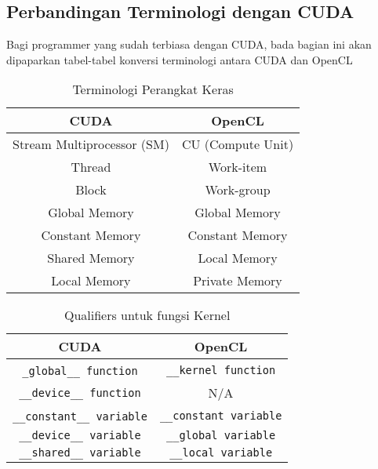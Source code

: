 \subsection{Perbandingan Terminologi dengan CUDA}

Bagi programmer yang sudah terbiasa dengan CUDA, bada bagian ini akan dipaparkan tabel-tabel konversi terminologi antara CUDA dan OpenCL

\begin{table}
	\centering
	\caption{Terminologi Perangkat Keras}
	\label{tab:terminologi_perangkat_keras}
	\begin{tabular}{|c|c|}
		\rowcolor[gray]{.9} \hline \rule[-2ex]{0pt}{5.5ex} CUDA & OpenCL \\ 
		\hline \rule[-2ex]{0pt}{5.5ex} Stream Multiprocessor (SM) & CU (Compute Unit) \\ 
		\hline \rule[-2ex]{0pt}{5.5ex} Thread & Work-item \\ 
		\hline \rule[-2ex]{0pt}{5.5ex} Block & Work-group \\ 
		\hline \rule[-2ex]{0pt}{5.5ex} Global Memory & Global Memory \\ 
		\hline \rule[-2ex]{0pt}{5.5ex} Constant Memory & Constant Memory \\ 
		\hline \rule[-2ex]{0pt}{5.5ex} Shared Memory & Local Memory \\ 
		\hline \rule[-2ex]{0pt}{5.5ex} Local Memory & Private Memory \\ 
		\hline 
	\end{tabular} 
\end{table}

\begin{table}
	\centering
	\caption{Qualifiers untuk fungsi Kernel}
	\label{tab:qualifiers_untuk_fungsi_kernel}
	\begin{tabular}{|c|c|}
		\rowcolor[gray]{.9} \hline \rule[-2ex]{0pt}{5.5ex} CUDA & OpenCL \\ 
		\hline \rule[-2ex]{0pt}{5.5ex} \verb|_global__ function|​ & \verb|__kernel function| \\ 
		\hline \rule[-2ex]{0pt}{5.5ex} \verb|__device__ function| & N/A \\ 
		\hline \rule[-2ex]{0pt}{5.5ex} \verb|__constant__ variable|​ & \verb|__constant variable| \\ 
		\hline \rule[-2ex]{0pt}{5.5ex} \verb|__device__ variable| & \verb|__global variable| \\ 
		\hline \rule[-2ex]{0pt}{5.5ex} \verb|__shared__ variable| & \verb|__local variable| \\ 
		\hline 
	\end{tabular} 
\end{table}


